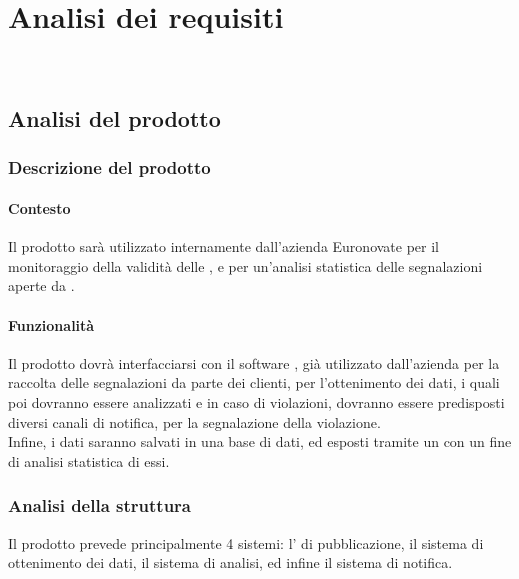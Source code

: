 
\chapter{Analisi dei requisiti}
\label{cap:analisi-requisiti}

\\
\section{Analisi del prodotto}
	\subsection{Descrizione del prodotto}
		\subsubsection{Contesto}
			Il prodotto sarà utilizzato internamente dall'azienda Euronovate per il monitoraggio della validità delle , e per un'analisi statistica delle segnalazioni aperte da .
		\subsubsection{Funzionalità} 
			Il prodotto dovrà interfacciarsi con il software , già utilizzato dall'azienda per la raccolta delle segnalazioni da parte dei clienti, per l'ottenimento dei dati, i quali poi dovranno essere analizzati e in caso di violazioni, dovranno essere predisposti diversi canali di notifica, per la segnalazione della violazione.\\
			Infine, i dati saranno salvati in una base di dati, ed esposti tramite un  con un fine di analisi statistica di essi.
		\subsection{Analisi della struttura} 
			Il prodotto prevede principalmente 4 sistemi: l' di pubblicazione, il sistema di ottenimento dei dati, il sistema di analisi, ed infine il sistema di notifica.
